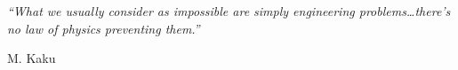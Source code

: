 

\epigraph{\textit{``What we usually consider as impossible are simply engineering problems\dots there's no law of physics preventing them.''}}{\textmd{M. Kaku} \cite{Jha2009a}}

